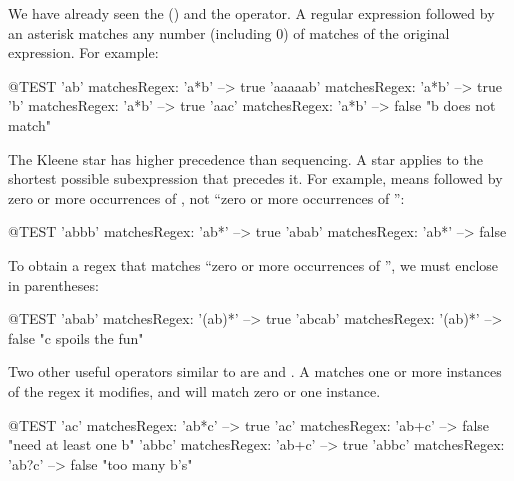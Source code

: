 \documentclass[a4paper,10pt,twoside]{book}
\begin{document}
We have already seen the  (\ct{*}) and the \ct{+} operator.
A regular expression followed by an asterisk matches any number (including 0) of matches of the original expression. For example:
\begin{code}{@TEST}
'ab' matchesRegex: 'a*b'         --> true
'aaaaab' matchesRegex: 'a*b' --> true
'b' matchesRegex: 'a*b'           --> true
'aac' matchesRegex: 'a*b'	    --> false    "b does not match"
\end{code}

The Kleene star has higher precedence than sequencing. A star applies to the
shortest possible subexpression that precedes it. For example, 
means  followed by zero or more occurrences of , not ``zero or more
occurrences of '':
\begin{code}{@TEST}
'abbb' matchesRegex: 'ab*' --> true
'abab' matchesRegex: 'ab*' --> false
\end{code}

To obtain a regex that matches ``zero or more occurrences of '', we must enclose  in parentheses:
\begin{code}{@TEST}
'abab' matchesRegex: '(ab)*'   --> true
'abcab' matchesRegex: '(ab)*' --> false    "c spoils the fun"
\end{code}

Two other useful operators similar to \ct{*} are \ct{+} and .
A \ct{+} matches one or more instances of the regex it modifies, and  will match zero or one instance.
\begin{code}{@TEST}
'ac' matchesRegex: 'ab*c'	   --> true
'ac' matchesRegex: 'ab+c'	  --> false    "need at least one b"
'abbc' matchesRegex: 'ab+c' --> true
'abbc' matchesRegex: 'ab?c' --> false    "too many b's"
\end{code}
\end{document}
